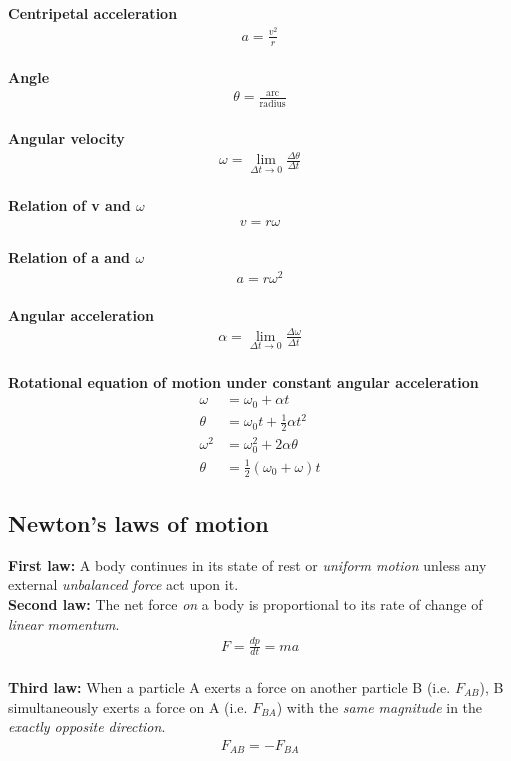 \documentclass[12pt,a4paper]{article}
\begin{document}
\textbf{Centripetal acceleration}
\begin{align}
a = \frac{v^{2}}{r}
\end{align}
\\
\textbf{Angle}
\begin{align}
\theta = \frac{\text{arc}}{\text{radius}}
\end{align}
\\
\textbf{Angular velocity}
\begin{align}
\omega = \lim_{\Delta t \to 0}\frac{\Delta \theta}{\Delta t}
\end{align}
\\
\textbf{Relation of v and $\omega$}
\begin{align}
v = r\omega
\end{align}
\\
\textbf{Relation of a and $\omega$}
\begin{align}
a = r\omega^{2}
\end{align}
\\
\textbf{Angular acceleration}
\begin{align}
\alpha = \lim_{\Delta t \to 0}\frac{\Delta \omega}{\Delta t}
\end{align}
\\
\textbf{Rotational equation of motion under constant angular acceleration}
\begin{align}
\omega &= \omega_{0} + \alpha t \\
\theta &= \omega_{0}t + \frac{1}{2}\alpha t^{2} \\
\omega^{2} &= \omega_{0}^{2} + 2\alpha \theta \\
\theta &= \frac{1}{2}(\omega_{0} + \omega)t
\end{align}

\subsection{Newton's laws of motion}

\textbf{First law:} A body continues in its state of rest or \emph{uniform motion} unless any external \emph{unbalanced force} act upon it.
\\
\textbf{Second law:} The net force \emph{on} a body is proportional to its rate of change of \emph{linear momentum}.
\begin{align}
F = \frac{dp}{dt} = ma
\end{align}
\\
\textbf{Third law:} When a particle A exerts a force on another particle B (i.e. $F_{AB}$), B simultaneously exerts a force on A (i.e. $F_{BA}$) with the \emph{same magnitude} in the \emph{exactly opposite direction}.
\begin{align}
F_{AB} = - F_{BA}
\end{align}
\end{document}
